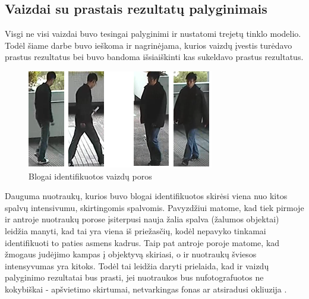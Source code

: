 \documentclass{VUMIFPSkursinis}
\DeclareRobustCommand{\[}{\begin{equation}}
\DeclareRobustCommand{\]}{\end{equation}}
\begin{document}
\pagebreak

\subsection{Vaizdai su prastais rezultatų palyginimais}
Visgi ne visi vaizdai buvo tesingai palyginimi ir nustatomi trejetų tinklo modelio. Todėl šiame darbe buvo ieškoma ir nagrinėjama, kurios vaizdų įvestis turėdavo prastus rezultatus bei buvo bandoma išsiaiškinti kas sukeldavo prastus rezultatus.

\begin{figure}[H]
\centering
\includegraphics[scale=1.0]{img/Wrongly_detected.png}
\caption{Blogai identifikuotos vaizdų poros} %
\label{img:mlp}
\end{figure}

Dauguma nuotraukų, kurios buvo blogai identifikuotos skirėsi viena nuo kitos spalvų intensivumu, skirtingomis spalvomis. Pavyzdžiui matome, kad tiek pirmoje ir antroje nuotraukų porose įsiterpusi nauja žalia spalva (žalumos objektai) leidžia manyti, kad tai yra viena iš priežasčių, kodėl nepavyko tinkamai identifikuoti to paties asmens kadrus. Taip pat antroje poroje matome, kad žmogaus judėjimo kampas į objektyvą skiriasi, o ir nuotraukų šviesos intensyvumas yra kitoks. Todėl tai leidžia daryti prielaida, kad ir vaizdų palyginimo rezultatai bus prasti, jei nuotraukos bus nufotografuotos ne kokybiškai - apšvietimo skirtumai, netvarkingas fonas ar atsiradusi okliuzija \cite{Person_reindentification}.
\pagebreak
\end{document}
